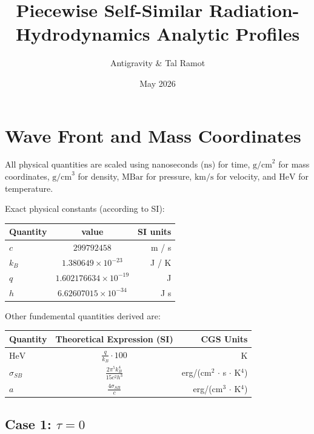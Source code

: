 \documentclass[11pt]{article}
\title{Piecewise Self-Similar Radiation-Hydrodynamics Analytic Profiles}
\author{Antigravity \& Tal Ramot}
\date{May 2026}
\newcommand{\HeV}{\text{HeV}}
\begin{document}
\maketitle

\section{Wave Front and Mass Coordinates}
All physical quantities are scaled using nanoseconds ($\text{ns}$) for time, $\text{g/cm}^2$ for mass coordinates, $\text{g/cm}^3$ for density, $\text{MBar}$ for pressure, $\text{km/s}$ for velocity, and $\text{HeV}$ for temperature.

Exact physical constants (according to SI):
\begin{center}
\begin{tabular}{l c r}
\hline
Quantity & value & SI units\\
\hline
$c$ & $299792458$ & m / s \\
$k_B$ & $1.380649 \times 10^{-23}$ & J / K \\
$q$ & $1.602176634 \times 10^{-19}$ & J \\
$h$ & $6.62607015 \times 10^{-34}$ & J s \\
\hline
\end{tabular}
\end{center}

Other fundemental quantities derived are:
\begin{center}
\begin{tabular}{l c r}
\hline
Quantity & Theoretical Expression (SI) & CGS Units \\ %
\hline
$\HeV$ & $\frac{q}{k_B} \cdot 100$ &  K \\
$\sigma_{SB}$ & $\frac{2\pi^5 k_B^4}{15 c^2 h^3}$ & erg/(cm$^2$ $\cdot$ s $\cdot$ K$^4$) \\
$a$ & $\frac{4 \sigma_{SB}}{c}$ & erg/(cm$^3$ $\cdot$ K$^4$)
\end{tabular}
\end{center}

\subsection{Case 1: $\tau=0$}
\end{document}
